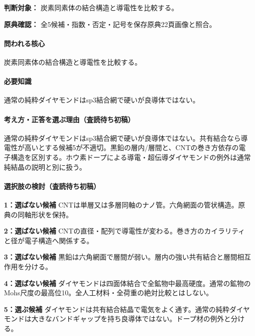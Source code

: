 \noindent\textbf{判断対象：} 炭素同素体の結合構造と導電性を比較する。\par

\noindent\textbf{原典確認：} 全5候補・指数・否定・記号を保存原典22頁画像と照合。\par

\paragraph{問われる核心} 炭素同素体の結合構造と導電性を比較する。

\paragraph{必要知識} 通常の純粋ダイヤモンドはsp3結合網で硬いが良導体ではない。

\paragraph{考え方・正答を選ぶ理由（査読待ち初稿）} 通常の純粋ダイヤモンドはsp3結合網で硬いが良導体ではない。共有結合なら導電性が高いとする候補5が不適切。黒鉛の層内/層間と、CNTの巻き方依存の電子構造を区別する。ホウ素ドープによる導電・超伝導ダイヤモンドの例外は通常純結晶の説明と別に扱う。

\paragraph{選択肢の検討（査読待ち初稿）}\mbox{}\par

\noindent\textbf{1：選ばない候補} CNTは単層又は多層同軸のナノ管。六角網面の管状構造。原典の同軸形状を保持。\par

\noindent\textbf{2：選ばない候補} CNTの直径・配列で導電性が変わる。巻き方のカイラリティと径が電子構造へ関係する。\par

\noindent\textbf{3：選ばない候補} 黒鉛は六角網面で層間が弱い。層内の強い共有結合と層間相互作用を分ける。\par

\noindent\textbf{4：選ばない候補} ダイヤモンドは四面体結合で全鉱物中最高硬度。通常の鉱物のMohs尺度の最高位10。全人工材料・全荷重の絶対比較とはしない。\par

\noindent\textbf{5：選ぶ候補} ダイヤモンドは共有結合結晶で電気をよく通す。通常の純粋ダイヤモンドは大きなバンドギャップを持ち良導体ではない。ドープ材の例外と分ける。\par

